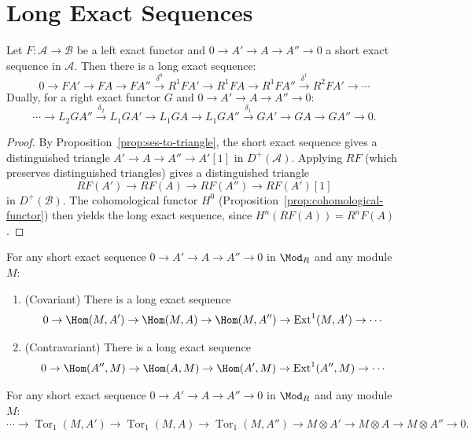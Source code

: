 \section{Long Exact Sequences}\label{sec:long-exact-derived}

\begin{theorem}\label{thm:les-derived}
Let $F \colon \mathcal{A} \to \mathcal{B}$ be a left exact functor and
$0 \to A' \to A \to A'' \to 0$ a short exact sequence in $\mathcal{A}$.
Then there is a long exact sequence:
\[
    0 \to FA' \to FA \to FA'' \xrightarrow{\delta^0} R^1 FA' \to R^1 FA \to R^1 FA''
    \xrightarrow{\delta^1} R^2 FA' \to \cdots
\]
Dually, for a right exact functor $G$ and $0 \to A' \to A \to A'' \to 0$:
\[
    \cdots \to L_2 GA'' \xrightarrow{\delta_2} L_1 GA' \to L_1 GA \to L_1 GA''
    \xrightarrow{\delta_1} GA' \to GA \to GA'' \to 0.
\]
\end{theorem}

\begin{proof}
By Proposition~\ref{prop:ses-to-triangle}, the short exact sequence gives a distinguished
triangle $A' \to A \to A'' \to A'[1]$ in $D^+(\mathcal{A})$. Applying $RF$ (which
preserves distinguished triangles) gives a distinguished triangle
\[
    RF(A') \to RF(A) \to RF(A'') \to RF(A')[1]
\]
in $D^+(\mathcal{B})$. The cohomological functor $H^0$ (Proposition~\ref{prop:cohomological-functor})
then yields the long exact sequence, since $H^n(RF(A)) = R^n F(A)$.
\end{proof}

\begin{corollary}\label{cor:ext-les}
For any short exact sequence $0 \to A' \to A \to A'' \to 0$ in $\Mod_R$ and any module $M$:
\begin{enumerate}
    \item (Covariant) There is a long exact sequence
    \[
        0 \to \Hom(M, A') \to \Hom(M, A) \to \Hom(M, A'') \to
        \operatorname{Ext}^1(M, A') \to \cdots
    \]
    \item (Contravariant) There is a long exact sequence
    \[
        0 \to \Hom(A'', M) \to \Hom(A, M) \to \Hom(A', M) \to
        \operatorname{Ext}^1(A'', M) \to \cdots
    \]
\end{enumerate}
\end{corollary}

\begin{corollary}\label{cor:tor-les}
For any short exact sequence $0 \to A' \to A \to A'' \to 0$ in $\Mod_R$ and any module $M$:
\[
    \cdots \to \operatorname{Tor}_1(M, A') \to \operatorname{Tor}_1(M, A) \to
    \operatorname{Tor}_1(M, A'') \to M \otimes A' \to M \otimes A \to M \otimes A'' \to 0.
\]
\end{corollary}

